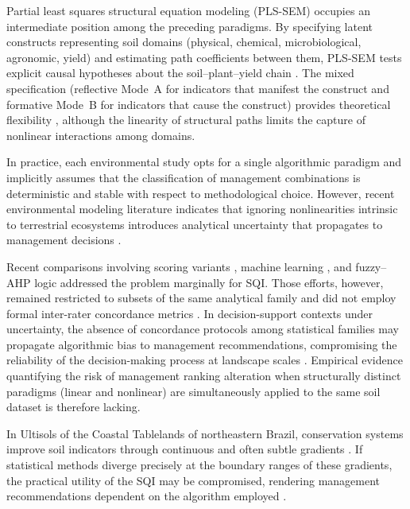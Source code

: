 \documentclass[pdflatex,sn-basic]{sn-jnl}%
\begin{document}
Partial least squares structural equation modeling (PLS-SEM) occupies an intermediate position among the preceding paradigms. By specifying latent constructs representing soil domains (physical, chemical, microbiological, agronomic, yield) and estimating path coefficients between them, PLS-SEM tests explicit causal hypotheses about the soil--plant--yield chain \citep{Hair2019,Sarstedt2022}. The mixed specification (reflective Mode~A for indicators that manifest the construct and formative Mode~B for indicators that cause the construct) provides theoretical flexibility \citep{Diamantopoulos2008}, although the linearity of structural paths limits the capture of nonlinear interactions among domains.

In practice, each environmental study opts for a single algorithmic paradigm and implicitly assumes that the classification of management combinations is deterministic and stable with respect to methodological choice. However, recent environmental modeling literature indicates that ignoring nonlinearities intrinsic to terrestrial ecosystems introduces analytical uncertainty that propagates to management decisions \citep{Yoshioka2024,Brito2024,Granata2024}.

Recent comparisons involving scoring variants \citep{Mukherjee2014}, machine learning \citep{Zeraatpisheh2020}, and fuzzy--AHP logic \citep{Pacci2026} addressed the problem marginally for SQI. Those efforts, however, remained restricted to subsets of the same analytical family and did not employ formal inter-rater concordance metrics \citep{Venkateswarlu2025,Liu2025}. In decision-support contexts under uncertainty, the absence of concordance protocols among statistical families may propagate algorithmic bias to management recommendations, compromising the reliability of the decision-making process at landscape scales \citep{Angelini2024,Jarvis2023}. Empirical evidence quantifying the risk of management ranking alteration when structurally distinct paradigms (linear and nonlinear) are simultaneously applied to the same soil dataset is therefore lacking.

In Ultisols of the Coastal Tablelands of northeastern Brazil, conservation systems improve soil indicators through continuous and often subtle gradients \citep{Assuncao2023,Oliveira2020}. If statistical methods diverge precisely at the boundary ranges of these gradients, the practical utility of the SQI may be compromised, rendering management recommendations dependent on the algorithm employed \citep{Rezaee2020,Obade2016}.
\end{document}
